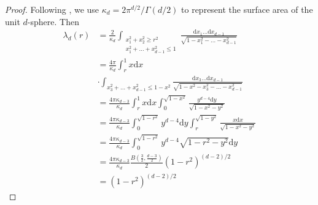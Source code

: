 \documentclass[conference,a4paper]{IEEEtran}
\def\d{\mathrm{d}}
\begin{document}
\begin{proof}
     Following \cite{dwyer1991convex}, we use $\kappa_d = 2\pi^{d/2}/\Gamma(d/2)$
     to represent the surface area of the unit $d$-sphere. Then
     \begin{align*}
          \lambda_d(r) &=\frac{2}{\kappa_d} 
          \int_{\substack{x_1^2+x_2^2\geq r^2\\
          x_1^2+\dots+x_{d-1}^2\leq 1 }} 
          \frac{\d x_1 \dots \d x_{d-1}}{\sqrt{1-x_1^2-\dots -x_{d-1}^2}} \\
      &= \frac{4\pi}{\kappa_d} \int_r^1 x\d x \\
      &\cdot\int_{x_3^2+\dots + x_{d-1}^2 \leq 1-x^2} \frac{\d x_3\dots \d x_{d-1}}
      {\sqrt{1-x^2-x_3^2-\dots -x_{d-1}^2}} \\
      &=\frac{4\pi \kappa_{d-3}}{\kappa_d} \int_r^1 x\d x \int_0^{\sqrt{1-x^2}} \frac{y^{d-4}\d y}{\sqrt{1-x^2-y^2}}\\
      &=\frac{4\pi \kappa_{d-3}}{\kappa_d} \int_0^{\sqrt{1-r^2}} y^{d-4}\d y \int_r^{\sqrt{1-y^2}} \frac{x\d x}{\sqrt{1-x^2-y^2}}\\
      &=\frac{4\pi \kappa_{d-3}}{\kappa_d} \int_0^{\sqrt{1-r^2}} y^{d-4}\sqrt{1-r^2-y^2} \d y\\
      &=\frac{4\pi \kappa_{d-3}}{\kappa_d}  \frac{B(\frac{3}{2 }, \frac{d-3}{2})}{2}(1-r^2)^{(d-2)/2}\\
      &=  (1-r^2)^{(d-2)/2}
      \end{align*}
\end{proof}
\end{document}
